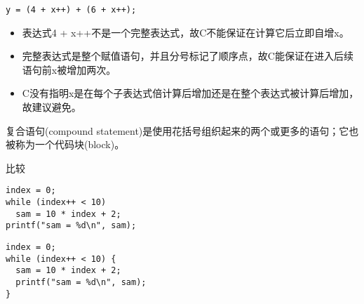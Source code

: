 \begin{frame}[fragile]

\begin{lstlisting}[backgroundcolor=\color{red!10}]
y = (4 + x++) + (6 + x++);
\end{lstlisting}

\begin{itemize}
\item \tf 表达式4 + x++不是一个完整表达式，故C不能保证在计算它后立即自增x。\\[0.1in] 
\item 完整表达式是整个赋值语句，并且分号标记了顺序点，故C能保证在进入后续语句前x被增加两次。\\[0.1in] 
\item C没有指明x是在每个子表达式倍计算后增加还是在整个表达式被计算后增加，故建议避免。

\end{itemize}

\end{frame}

\begin{frame}[fragile]
  \begin{dingyi}
    \textcolor{acolor3}{复合语句}(compound statement)是使用花括号组织起来的两个或更多的语句；它也被称为一个代码块(block)。    
  \end{dingyi}

\end{frame}

\begin{frame}[fragile]
比较
\begin{lstlisting}[backgroundcolor=\color{red!10}]
index = 0;
while (index++ < 10)
  sam = 10 * index + 2;
printf("sam = %d\n", sam);
\end{lstlisting}

\begin{lstlisting}[backgroundcolor=\color{red!10}]
index = 0;
while (index++ < 10) {
  sam = 10 * index + 2;
  printf("sam = %d\n", sam);
}
\end{lstlisting}
\end{frame}

